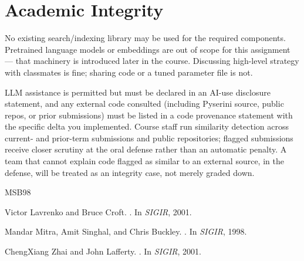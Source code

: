 \documentclass[10pt]{article}
\begin{document}
\section{Academic Integrity}
No existing search/indexing library may be used for the required components. Pretrained language models or embeddings are out of scope for this assignment — that machinery is introduced later in the course. Discussing high-level strategy with classmates is fine; sharing code or a tuned parameter file is not.

LLM assistance is permitted but must be declared in an AI-use disclosure statement, and any external code consulted (including Pyserini source, public repos, or prior submissions) must be listed in a code provenance statement with the specific delta you implemented. Course staff run similarity detection across current- and prior-term submissions and public repositories; flagged submissions receive closer scrutiny at the oral defense rather than an automatic penalty. A team that cannot explain code flagged as similar to an external source, in the defense, will be treated as an integrity case, not merely graded down.

\begin{thebibliography}{MSB98}

Victor Lavrenko and Bruce Croft.
.
\newblock In {\em SIGIR}, 2001.

Mandar Mitra, Amit Singhal, and Chris Buckley.
.
\newblock In {\em SIGIR}, 1998.

ChengXiang Zhai and John Lafferty.
.
\newblock In {\em SIGIR}, 2001.

\end{thebibliography}
\end{document}
